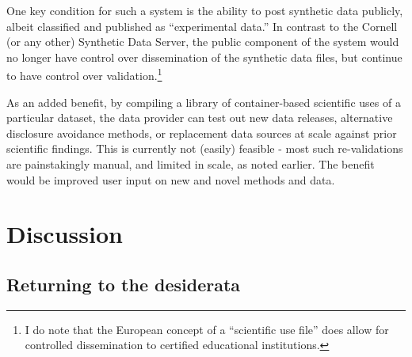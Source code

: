 \documentclass[inline]{hdsr}
\begin{document}
One key condition for such a system is the ability to post synthetic data publicly, albeit  classified and published as ``experimental data.'' In contrast to the Cornell (or any other) Synthetic Data Server, the public component of the system would no longer have control over dissemination of the synthetic data files, but continue to have control over validation.\footnote{I do note that the European concept of a ``scientific use file'' does allow for controlled dissemination to certified educational institutions.}

As an added benefit, by compiling a library of container-based scientific uses of a particular dataset, the data provider can test out new data releases, alternative disclosure avoidance methods, or replacement data sources  at scale against prior scientific findings. This is currently not (easily) feasible - most such re-validations are painstakingly manual, and limited in scale, as noted earlier. The benefit would be improved user input on new and novel methods and data.


\section{Discussion}



\subsection{Returning to the desiderata}
\end{document}
